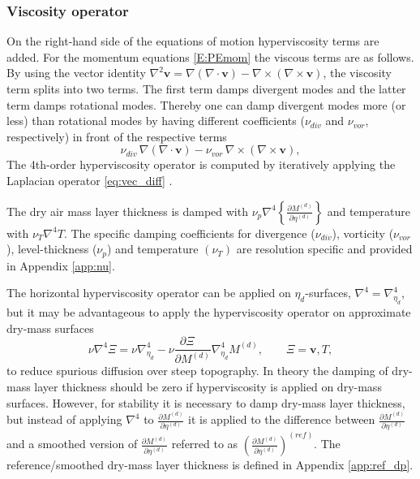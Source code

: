 \documentclass{agujournal}
\begin{document}
{\subsubsection{Viscosity operator}\label{sec:hyper}
On the right-hand side of the equations of motion hyperviscosity terms are added. For the momentum equations \eqref{E:PEmom} the viscous terms are as follows. By using the vector identity  $\nabla^2 \mathbf{v} = \nabla(\nabla \cdot \mathbf{v}) - \nabla \times (\nabla \times \mathbf{v}) $, the viscosity term splits into two terms. The first term damps divergent modes and the latter term damps rotational modes. Thereby one can damp divergent modes more (or less) than rotational modes by having different coefficients ($\nu_{div}$ and $\nu_{vor}$, respectively) in front of the respective terms
 \begin{equation}
  \nu_{div} \, \nabla(\nabla \cdot \mathbf{v}) -
   \nu_{vor} \,  \nabla \times (\nabla \times \mathbf{v}),\label{eq:vec_diff}
 \end{equation}
The 4th-order hyperviscosity operator is computed by iteratively applying the Laplacian operator \eqref{eq:vec_diff} \citep[for a detailed derivation with metric terms see, e.g., ][]{U2014GMD}. 

The dry air mass layer thickness is damped with $\nu_p \nabla^4\left\{ \frac{\partial M^{(d)}}{\partial \eta^{(d)}}\right\}$ and temperature with $\nu_T \nabla^4 T$. The specific damping coefficients for divergence ($\nu_{div}$), vorticity ($\nu_{vor}$), level-thickness ($\nu_p$) and temperature $(\nu_T)$ are resolution specific and provided in Appendix \ref{app:nu}.

The horizontal hyperviscosity operator can be applied on $\eta_d$-surfaces, $\nabla^4=\nabla^4_{\eta_d}$, but it may be advantageous to apply the hyperviscosity operator on approximate dry-mass surfaces
\begin{equation}
\nu \nabla^4 \Xi =\nu \nabla^4_{\eta_d}-\nu \frac{\partial \Xi\quad }{\partial M^{(d)}} \nabla^4_{\eta_d}M^{(d)},\qquad \Xi=\mathbf{v}, T,
\end{equation}
\citep[p.58 in ][]{CAM5} to reduce spurious diffusion over steep topography. In theory the damping of dry-mass layer thickness should be zero if hyperviscosity is applied on dry-mass surfaces. However, for stability it is necessary to damp dry-mass layer thickness, but instead of applying $\nabla^4$ to $\frac{\partial M^{(d)}}{\partial \eta^{(d)}}$ it is applied to the difference between $\frac{\partial M^{(d)}}{\partial \eta^{(d)}}$ and a smoothed version of $\frac{\partial M^{(d)}}{\partial \eta^{(d)}}$ referred to as $\left( \frac{\partial M^{(d)}}{\partial \eta^{(d)}}\right)^{(ref)}$. The reference/smoothed dry-mass layer thickness is defined in Appendix \ref{app:ref_dp}. 

}
\end{document}
